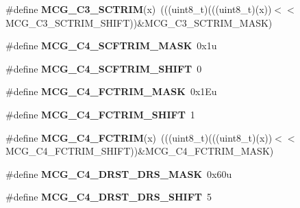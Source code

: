 \begin{DoxyCompactItemize}
\item 
\#define {\bfseries M\+C\+G\+\_\+\+C3\+\_\+\+S\+C\+T\+R\+IM}(x)~(((uint8\+\_\+t)(((uint8\+\_\+t)(x))$<$$<$M\+C\+G\+\_\+\+C3\+\_\+\+S\+C\+T\+R\+I\+M\+\_\+\+S\+H\+I\+FT))\&M\+C\+G\+\_\+\+C3\+\_\+\+S\+C\+T\+R\+I\+M\+\_\+\+M\+A\+SK)\hypertarget{group__MCG__Register__Masks_ga66a74a75c9244dad3298474a2bf04de8}{}\label{group__MCG__Register__Masks_ga66a74a75c9244dad3298474a2bf04de8}

\item 
\#define {\bfseries M\+C\+G\+\_\+\+C4\+\_\+\+S\+C\+F\+T\+R\+I\+M\+\_\+\+M\+A\+SK}~0x1u\hypertarget{group__MCG__Register__Masks_ga7386e83fdee774ec5d6ec402bae1e432}{}\label{group__MCG__Register__Masks_ga7386e83fdee774ec5d6ec402bae1e432}

\item 
\#define {\bfseries M\+C\+G\+\_\+\+C4\+\_\+\+S\+C\+F\+T\+R\+I\+M\+\_\+\+S\+H\+I\+FT}~0\hypertarget{group__MCG__Register__Masks_ga1114052674119b01137ef4b4885ab757}{}\label{group__MCG__Register__Masks_ga1114052674119b01137ef4b4885ab757}

\item 
\#define {\bfseries M\+C\+G\+\_\+\+C4\+\_\+\+F\+C\+T\+R\+I\+M\+\_\+\+M\+A\+SK}~0x1\+Eu\hypertarget{group__MCG__Register__Masks_ga91610035649d14c5027419db0bfa3231}{}\label{group__MCG__Register__Masks_ga91610035649d14c5027419db0bfa3231}

\item 
\#define {\bfseries M\+C\+G\+\_\+\+C4\+\_\+\+F\+C\+T\+R\+I\+M\+\_\+\+S\+H\+I\+FT}~1\hypertarget{group__MCG__Register__Masks_ga0a1b1f2be0b8e9afc3ff91ab11d71a1e}{}\label{group__MCG__Register__Masks_ga0a1b1f2be0b8e9afc3ff91ab11d71a1e}

\item 
\#define {\bfseries M\+C\+G\+\_\+\+C4\+\_\+\+F\+C\+T\+R\+IM}(x)~(((uint8\+\_\+t)(((uint8\+\_\+t)(x))$<$$<$M\+C\+G\+\_\+\+C4\+\_\+\+F\+C\+T\+R\+I\+M\+\_\+\+S\+H\+I\+FT))\&M\+C\+G\+\_\+\+C4\+\_\+\+F\+C\+T\+R\+I\+M\+\_\+\+M\+A\+SK)\hypertarget{group__MCG__Register__Masks_ga7ffe6f164c3d7440b9911c8de59b7171}{}\label{group__MCG__Register__Masks_ga7ffe6f164c3d7440b9911c8de59b7171}

\item 
\#define {\bfseries M\+C\+G\+\_\+\+C4\+\_\+\+D\+R\+S\+T\+\_\+\+D\+R\+S\+\_\+\+M\+A\+SK}~0x60u\hypertarget{group__MCG__Register__Masks_ga7f6629e8d17efb2cec3d2f63d09ede5a}{}\label{group__MCG__Register__Masks_ga7f6629e8d17efb2cec3d2f63d09ede5a}

\item 
\#define {\bfseries M\+C\+G\+\_\+\+C4\+\_\+\+D\+R\+S\+T\+\_\+\+D\+R\+S\+\_\+\+S\+H\+I\+FT}~5\hypertarget{group__MCG__Register__Masks_ga27d4baa0c8a770f1f67ab47e6407e948}{}\label{group__MCG__Register__Masks_ga27d4baa0c8a770f1f67ab47e6407e948}


\end{DoxyCompactItemize}
